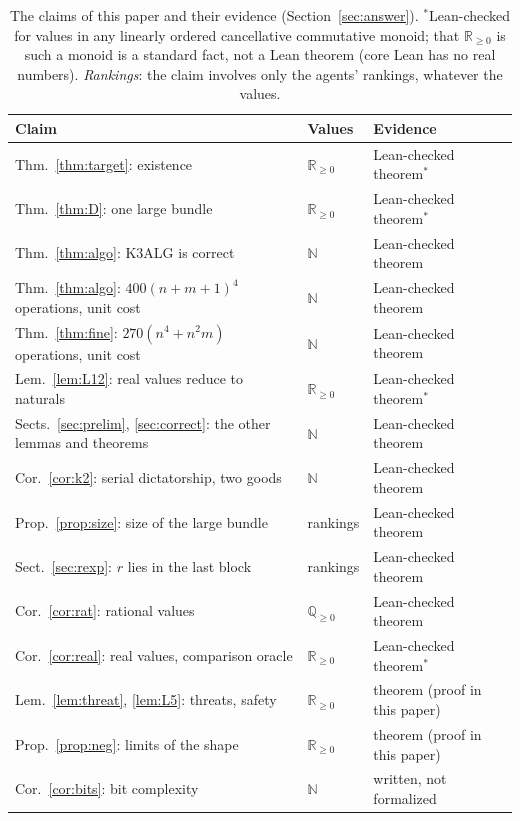 \documentclass[runningheads,11pt]{llncs}
\begin{document}
\begin{table}[tbp]
\caption{The claims of this paper and their evidence (Section~\ref{sec:answer}). $^*$Lean-checked for values in any linearly ordered cancellative commutative monoid; that $\mathbb{R}_{\ge0}$ is such a monoid is a standard fact, not a Lean theorem (core Lean has no real numbers). \emph{Rankings}: the claim involves only the agents' rankings, whatever the values.}\label{tab:status}
\centering\small
\setlength{\tabcolsep}{4pt}\begin{tabular}{@{}>{\raggedright\arraybackslash}p{}ll@{}}
\toprule
Claim & Values & Evidence \\
\midrule
Thm.~\ref{thm:target}: existence & $\mathbb{R}_{\ge0}$ & Lean-checked theorem$^*$ \\
Thm.~\ref{thm:D}: one large bundle & $\mathbb{R}_{\ge0}$ & Lean-checked theorem$^*$ \\
Thm.~\ref{thm:algo}: K3ALG is correct & $\mathbb{N}$ & Lean-checked theorem \\
Thm.~\ref{thm:algo}: $400(n+m+1)^4$ operations, unit cost & $\mathbb{N}$ & Lean-checked theorem \\
Thm.~\ref{thm:fine}: $270(n^4+n^2m)$ operations, unit cost & $\mathbb{N}$ & Lean-checked theorem \\
Lem.~\ref{lem:L12}: real values reduce to naturals & $\mathbb{R}_{\ge0}$ & Lean-checked theorem$^*$ \\
Sects.~\ref{sec:prelim}, \ref{sec:correct}: the other lemmas and theorems & $\mathbb{N}$ & Lean-checked theorem \\
Cor.~\ref{cor:k2}: serial dictatorship, two goods & $\mathbb{N}$ & Lean-checked theorem \\
Prop.~\ref{prop:size}: size of the large bundle & rankings & Lean-checked theorem \\
Sect.~\ref{sec:rexp}: $r$ lies in the last block & rankings & Lean-checked theorem \\
Cor.~\ref{cor:rat}: rational values & $\mathbb{Q}_{\ge0}$ & Lean-checked theorem \\
Cor.~\ref{cor:real}: real values, comparison oracle & $\mathbb{R}_{\ge0}$ & Lean-checked theorem$^*$ \\
Lem.~\ref{lem:threat}, \ref{lem:L5}: threats, safety & $\mathbb{R}_{\ge0}$ & theorem (proof in this paper) \\
Prop.~\ref{prop:neg}: limits of the shape & $\mathbb{R}_{\ge0}$ & theorem (proof in this paper) \\
Cor.~\ref{cor:bits}: bit complexity & $\mathbb{N}$ & written, not formalized \\

\end{tabular}
\end{table}
\end{document}
